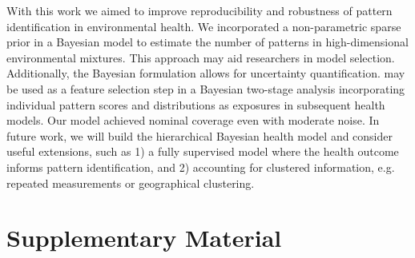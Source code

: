 With this work we aimed to improve reproducibility and robustness of pattern identification in environmental health. We incorporated a non-parametric sparse prior in a Bayesian model to estimate the number of patterns in high-dimensional environmental mixtures. This approach may aid researchers in model selection. Additionally, the Bayesian formulation allows for uncertainty quantification. \bnmf may be used as a feature selection step in a Bayesian two-stage analysis incorporating individual pattern scores and distributions as exposures in subsequent health models. Our model achieved nominal coverage even with moderate noise. In future work, we will build the hierarchical Bayesian health model and consider useful extensions, such as 1) a fully supervised model where the health outcome informs pattern identification, and 2) accounting for clustered information, e.g. repeated measurements or geographical clustering.

\setcounter{figure}{0}
\setcounter{table}{0}
\renewcommand{\thefigure}{S\arabic{figure}}
\renewcommand{\thetable}{S\arabic{table}}
\clearpage
\section{Supplementary Material}
\label{sec6}


